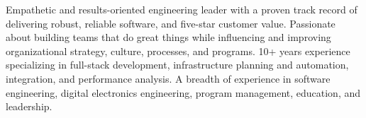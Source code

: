 

\begin{cvparagraph}

Empathetic and results-oriented engineering leader with a proven track record
of delivering robust, reliable software, and five-star customer value.
Passionate about building teams that do great things while influencing
and improving organizational strategy, culture, processes, and programs.
10+ years experience specializing in full-stack development, infrastructure 
planning and automation, integration, and performance analysis. A breadth
of experience in software engineering, digital electronics engineering, 
program management, education, and leadership.


\end{cvparagraph}
